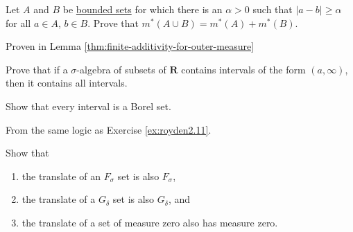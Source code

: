   \begin{exercise}[Royden 2.10]
    Let $A$ and $B$ be \hyperref[pst-def:bounded-set]{bounded sets} for which there is an $\alpha > 0$ such that $|a - b| \geq \alpha$ for all $a \in A$, $b \in B$. Prove that $m^{\ast}(A \cup B) = m^{\ast}(A) + m^{\ast}(B)$.
  \end{exercise}
  \begin{solution}
    Proven in Lemma \ref{thm:finite-additivity-for-outer-measure}
  \end{solution}

  \begin{exercise}[Royden 2.11][ex:royden2.11]
    Prove that if a $\sigma$-algebra of subsets of $\mathbf{R}$ contains intervals of the form $(a, \infty)$, then it contains all intervals.
  \end{exercise}

  \begin{exercise}[Royden 2.12]
    Show that every interval is a Borel set.
  \end{exercise}
  \begin{solution}
    From the same logic as Exercise \ref{ex:royden2.11}. 
  \end{solution}

  \begin{exercise}[Royden 2.13]
    Show that 
    \begin{enumerate}
      \item the translate of an $F_{\sigma}$ set is also $F_{\sigma}$, 
      \item the translate of a $G_{\delta}$ set is also $G_{\delta}$, and 
      \item the translate of a set of measure zero also has measure zero.
    \end{enumerate}
  \end{exercise}

